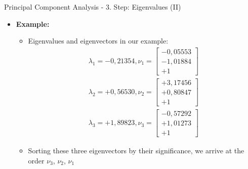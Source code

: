 \begin{frame}{Principal Component Analysis - 3. Step: Eigenvalues (II)}
	\begin{itemize}
		\item \textbf{Example:}
		      \begin{itemize}
			      \item Eigenvalues and eigenvectors in our example: \\
			            \begin{align}
				            \lambda_1 = -0,21354,
				            \nu_1 = \begin{bmatrix} -0,05553 \\ -1,01884 \\ +1
				            \end{bmatrix}
				            \\
				            \lambda_2 = +0,56530,
				            \nu_2 = \begin{bmatrix} +3,17456 \\ +0,80847 \\ +1
				            \end{bmatrix}
				            \\
				            \lambda_3 = +1,89823,
				            \nu_3 = \begin{bmatrix} -0,57292 \\ +1,01273 \\ +1 \end{bmatrix}
			            \end{align}
			      \item Sorting these three eigenvectors by their significance, we
			            arrive at the order $\nu_3$, $\nu_2$, $\nu_1$
		      \end{itemize}
	\end{itemize}
\end{frame}

